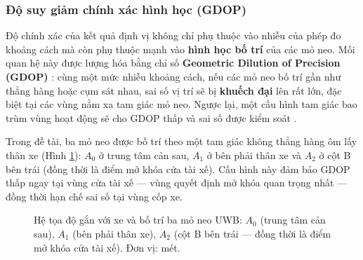 \subsubsection{Độ suy giảm chính xác hình học (GDOP)}

Độ chính xác của kết quả định vị không chỉ phụ thuộc vào nhiễu của phép đo khoảng cách mà còn phụ thuộc mạnh vào \textbf{hình học bố trí} của các mỏ neo. Mối quan hệ này được lượng hóa bằng chỉ số \textbf{Geometric Dilution of Precision (GDOP)} \cite{langley1999gdop}: cùng một mức nhiễu khoảng cách, nếu các mỏ neo bố trí gần như thẳng hàng hoặc cụm sát nhau, sai số vị trí sẽ bị \textbf{khuếch đại} lên rất lớn, đặc biệt tại các vùng nằm xa tam giác mỏ neo. Ngược lại, một cấu hình tam giác bao trùm vùng hoạt động sẽ cho GDOP thấp và sai số được kiểm soát \cite{ridolfi2018analysis}.

Trong đề tài, ba mỏ neo được bố trí theo một tam giác không thẳng hàng ôm lấy thân xe (Hình \ref{fig:anchor_geometry}): $A_0$ ở trung tâm cản sau, $A_1$ ở bên phải thân xe và $A_2$ ở cột B bên trái (đồng thời là điểm mở khóa cửa tài xế). Cấu hình này đảm bảo GDOP thấp ngay tại vùng cửa tài xế --- vùng quyết định mở khóa quan trọng nhất --- đồng thời hạn chế sai số tại vùng cốp xe.

\begin{figure}[H]
    \centering
    \caption[Hệ tọa độ xe và bố trí ba mỏ neo UWB]{Hệ tọa độ gắn với xe và bố trí ba mỏ neo UWB: $A_0$ (trung tâm cản sau), $A_1$ (bên phải thân xe), $A_2$ (cột B bên trái --- đồng thời là điểm mở khóa cửa tài xế). Đơn vị: mét.}
    \label{fig:anchor_geometry}
\end{figure}

